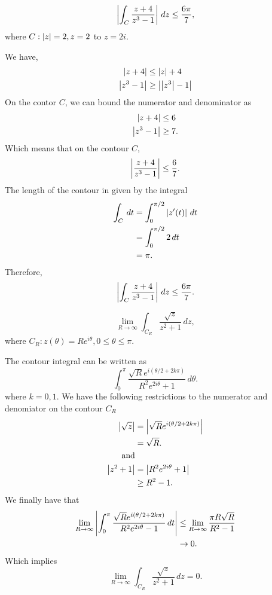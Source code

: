\documentclass[12pt]{book}
\begin{document}
\begin{exmp}
    \[
        \left\lvert \int_{C} \frac{z + 4}{z^3 - 1} \right\rvert\,dz \leq \frac{6\pi}{7},
    \]
    where $C: \left\lvert z \right\rvert = 2, z = 2$ to $z = 2i.$
\end{exmp}
We have,
\begin{align*}
    \left\lvert z + 4 \right\rvert 
        &\leq \left\lvert z \right\rvert + 4 \\
    \left\lvert z^3 - 1 \right\rvert
        &\geq \left\lvert \left\lvert z^{3} \right\rvert - 1 \right\rvert
\end{align*}
On the contor $C$, we can bound the numerator and denominator as 
\begin{align*}
    \left\lvert z + 4 \right\rvert 
        &\leq 6 \\
    \left\lvert z^3 - 1 \right\rvert
        &\geq 7.
\end{align*}
Which means that on the contour $C$, 
\[
    \left\lvert \frac{z + 4}{z^3 - 1} \right\rvert \leq \frac{6}{7}.
\]
The length of the contour in given by the integral
\begin{align*}
    \int_{C}\,dt
        &=
            \int_{0}^{\pi/2} \left\lvert z'(t) \right\rvert\,dt \\
        &=
            \int_{0}^{\pi/2} 2\,dt \\
        &=
            \pi.
\end{align*}
Therefore,
\[
    \left\lvert \int_{C} \frac{z + 4}{z^3 - 1} \right\rvert\,dz \leq \frac{6\pi}{7}.
\]

\begin{exmp}
    \[
        \lim_{R \rightarrow \infty} \int_{C_{R}} \frac{\sqrt{z}}{z^2 + 1}\,dz,
    \]
    where $C_{R}: z(\theta) = Re^{i\theta}, 0 \leq \theta \leq \pi.$
\end{exmp}
The contour integral can be written as 
\[
    \int_{0}^{\pi} \frac{\sqrt{R} e^{i(\theta / 2 + 2k\pi)}}{R^2e^{2i\theta} + 1}\,d\theta.
\]
where $k = 0, 1.$ We have the following restrictions to the numerator and denomiator on the contour $C_{R}$
\begin{align*}
    \left\lvert \sqrt{z} \right\rvert
        &=
            \left\lvert \sqrt{R} e^{i(\theta / 2 + 2k\pi)} \right\rvert \\
        &=
            \sqrt{R}. \\
    \text{and} \\
    \left\lvert z^2 + 1 \right\rvert
        &=
            \left\lvert R^2e^{2i\theta} + 1 \right\rvert \\
        &\geq
            R^2 - 1. \\
\end{align*}
We finally have that 
\begin{align*}
    \lim_{R \rightarrow \infty}\left\lvert \int_{0}^{\pi} \frac{\sqrt{R} e^{i(\theta / 2 + 2k\pi)}}{R^2e^{2i\theta} - 1}\,dt \right\rvert 
        &\leq 
            \lim_{R \rightarrow \infty}\frac{\pi R\sqrt{R}}{R^2 - 1} \\
        &\rightarrow 
            0.
\end{align*}
Which implies
\[
    \lim_{R \rightarrow \infty} \int_{C_{R}} \frac{\sqrt{z}}{z^2 + 1}\,dz = 0.
\]
\end{document}
